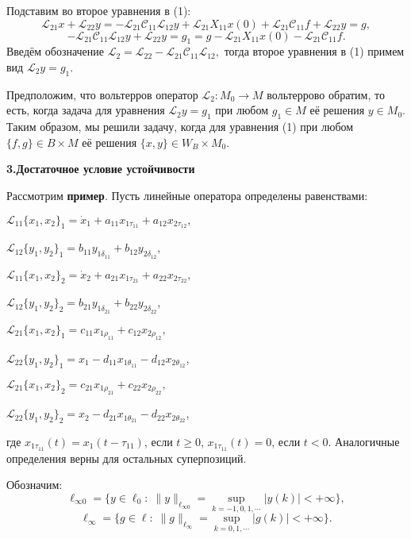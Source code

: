 Подставим во второе уравнения в (1):
$${\mathcal L}_{21} x+{\mathcal L}_{22} y =
-{\mathcal L}_{21} {\mathcal C}_{11} {\mathcal L}_{12} y+{\mathcal L}_{21} X_{11} x(0)+{\mathcal L}_{21} {\mathcal C}_{11} f+{\mathcal L}_{22} y=g,
$$
$$
- {\mathcal L}_{21} {\mathcal C}_{11} {\mathcal L}_{12} y+{\mathcal L}_{22} y=g_{1} =g- {\mathcal L}_{21} X_{11} x(0)-{\mathcal L}_{21} {\mathcal C}_{11} f.
$$
Введём обозначение ${\mathcal L}_2= {\mathcal L}_{22} -{\mathcal L}_{21} {\mathcal C}_{11} {\mathcal L}_{12} ,$ тогда второе уравнения в (1) примем вид ${\mathcal L}_2y=g_{1} .$

Предположим, что вольтерров оператор ${\mathcal L}_2:M_{0} \to M$ вольтеррово обратим, то есть, когда задача для уравнения ${\mathcal L}_2 y=g_{1} $ при любом $g_{1} \in M$ её решения $y\in M_{0} .$ Таким образом, мы решили задачу, когда для уравнения (1) при любом $\{ f,g\} \in B\times M $ её решения $\{ x,y\} \in W_{B}\times M_{0} .$


\smallskip \centerline{\bf 3.Достаточное условие устойчивости} \nopagebreak

Рассмотрим {\bf пример}. Пусть линейные оператора определены равенствами:

${\mathcal L}_{11}\{x_1,x_2\}_1 = \dot{x}_1 +
a_{11}x_{1\tau_{11}} + a_{12}x_{2\tau_{12}},$

${\mathcal L}_{12}\{y_1,y_2\}_1 = b_{11}y_{1\delta_{11}} + b_{12}y_{2\delta_{12}}$,


${\mathcal L}_{11}\{x_1,x_2\}_2 = \dot{x}_2 +
a_{21}x_{1\tau_{21}} + a_{22}x_{2\tau_{22}},$

${\mathcal L}_{12}\{y_1,y_2\}_2 = b_{21}y_{1\delta_{21}} + b_{22}y_{2\delta_{22}}$,


${\mathcal L}_{21}\{x_1,x_2\}_1 = c_{11}x_{1\rho_{11}} +
c_{12}x_{2\rho_{12}},$

${\mathcal L}_{22}\{y_1,y_2\}_1 = x_1 - d_{11}x_{1\theta_{11}} - d_{12}x_{2\theta_{12}}$,

${\mathcal L}_{21}\{x_1,x_2\}_2 = c_{21}x_{1\rho_{21}} +
c_{22}x_{2\rho_{22}},$

${\mathcal L}_{22}\{y_1,y_2\}_2 = x_2 - d_{21}x_{1\theta_{21}} - d_{22}x_{2\theta_{22}}$,

\noindent где $x_{1\tau_{11}}(t)=x_1(t-\tau_{11})$, если $t \geq 0$, $x_{1\tau_{11}}(t)=0$, если $t < 0$. Аналогичные определения верны
для остальных суперпозиций.

Обозначим:
$$
\ell_{\infty 0} =\{y\in \ell_{0}: \; \|y\|_{\ell_{\infty 0}} = \mathop{\sup}\limits_{k=-1,0,1,\cdots} |y(k)| <+\infty \},
$$
$$
\ell_{\infty} =\{g\in \ell: \; \|g\|_{\ell_{\infty}} = \mathop{\sup}\limits_{k=0,1,\cdots} |g(k)| <+\infty \}.
$$


